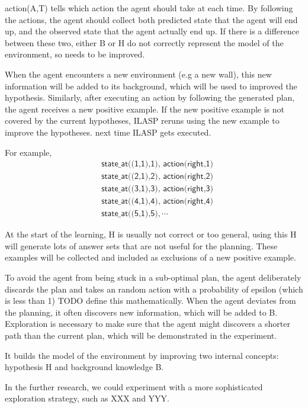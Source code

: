 action(A,T) tells which action the agent should take at each time. By following the actions, the agent should collect both predicted state that the
agent will end up, and the observed state that the agent actually end up. If there is a difference between these two, either B or H do not correctly represent
the model of the environment, so needs to be improved.

When the agent encounters a new environment (e.g a new wall), this new information will be added to its background, which will be used to improved the hypothesis. 
Similarly, after executing an action by following the generated plan, the agent receives a new positive example. If the new positive example is not covered by the current hypotheses, 
ILASP reruns using the new example to improve the hypotheses. 
next time ILASP gets executed.

For example,
\begin{equation*}
\begin{split}
&\textsf{state\_at((1,1),1), action(right,1)}\\
&\textsf{state\_at((2,1),2), action(right,2)}\\
&\textsf{state\_at((3,1),3), action(right,3)}\\
&\textsf{state\_at((4,1),4), action(right,4)}\\
&\textsf{state\_at((5,1),5)}, \cdots
\end{split}
\end{equation*}

At the start of the learning, H is usually not correct or too general, using this H will generate lots of answer sets that are not useful for the planning.
These examples will be collected and included as exclusions of a new positive example.

To avoid the agent from being stuck in a sub-optimal plan, the agent deliberately discards the plan and takes an random action with a probability of
epsilon (which is less than 1) TODO define this mathematically.
When the agent deviates from the planning, it often discovers new information, which will be added to B.
Exploration is necessary to make sure that the agent might discovers a shorter path than the current plan, which will be demonstrated in the experiment.

It builds the model of the environment by improving two internal concepts: hypothesis H and background knowledge B.

In the further research, we could experiment with a more sophisticated exploration strategy, such as XXX and YYY.

